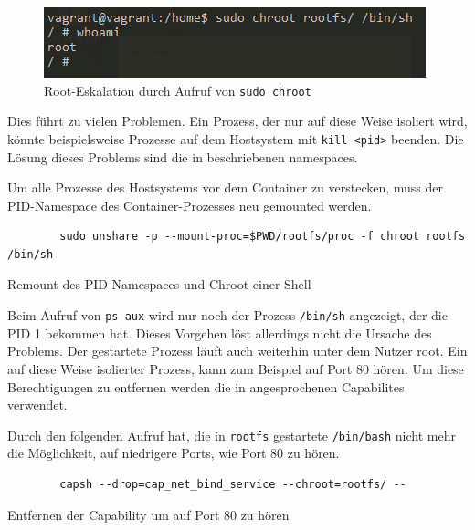 \begin{figure}[h]
	\begin{center}
		\includegraphics[scale=1]{bilder/chroot-whoami-root.png}
		\caption{Root-Eskalation durch Aufruf von \texttt{sudo chroot}}
		\label{fig:chrootWhoami}
	\end{center}
\end{figure}

Dies führt zu vielen Problemen. Ein Prozess, der nur auf diese Weise isoliert wird, könnte beispielsweise Prozesse auf dem Hostsystem mit \texttt{kill <pid>} beenden. Die Lösung dieses Problems sind die in  beschriebenen namespaces.

Um alle Prozesse des Hostsystems vor dem Container zu verstecken, muss der PID-Namespace des Container-Prozesses neu gemounted werden.
\begin{listing}[h]
	\begin{verbatim}
		sudo unshare -p --mount-proc=$PWD/rootfs/proc -f chroot rootfs /bin/sh
	\end{verbatim}
	\caption{Remount des PID-Namespaces und Chroot einer Shell}
\end{listing}

Beim Aufruf von \glqq \texttt{ps aux}\grqq{} wird nur noch der Prozess \texttt{/bin/sh} angezeigt, der die PID 1 bekommen hat. Dieses Vorgehen löst allerdings nicht die Ursache des Problems. Der gestartete Prozess läuft auch weiterhin unter dem Nutzer root. Ein auf diese Weise isolierter Prozess, kann zum Beispiel auf Port 80 hören. Um diese Berechtigungen zu entfernen werden die in  angesprochenen Capabilites verwendet.

Durch den folgenden Aufruf hat, die in \texttt{rootfs} gestartete \texttt{/bin/bash} nicht mehr die Möglichkeit, auf niedrigere Ports, wie Port 80 zu hören.

\begin{listing}[h]
	\begin{verbatim}
		capsh --drop=cap_net_bind_service --chroot=rootfs/ --
	\end{verbatim}
	\caption{Entfernen der Capability um auf Port 80 zu hören}
\end{listing}

